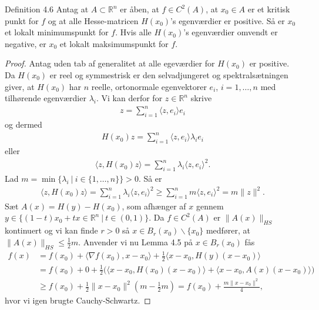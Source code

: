\begin{boks}{Definition 4.6}
  Antag at $A \subset \mathbb{R}^n$ er åben, at $f \in C^2(A)$, at $x_0 \in A$ er et kritisk punkt for $f$ og at alle Hesse-matricen $H(x_0)$'s egenværdier er positive.
  Så er $x_0$ et lokalt minimumspunkt for $f$. Hvis alle $H(x_0)$'s egenværdier omvendt er negative, er $x_0$ et lokalt maksimumspunkt for $f$.
\end{boks}
\begin{proof}
  Antag uden tab af generalitet at alle egeværdier for $H(x_0)$ er positive.
  Da $H(x_0)$ er reel og symmestrisk er den selvadjungeret og spektralsætningen giver, at $H(x_0)$ har $n$ reelle, ortonormale egenvektorer $e_i$, $i = 1, \ldots, n$ med tilhørende egenværdier $\lambda_i$. Vi kan derfor for $z \in \mathbb{R}^n$ skrive
  \begin{align*}
    z = \sum_{i = 1}^n \langle z, e_i \rangle e_i
  \end{align*}
  og dermed
  \begin{align*}
    H(x_0)z = \sum_{i = 1}^n \langle z, e_i \rangle \lambda_i e_i
  \end{align*}
  eller
  \begin{align*}
    \langle z, H(x_0)z \rangle = \sum_{i = 1}^n \lambda_i \langle z, e_i \rangle^2.
  \end{align*}
  Lad $m = \min \{ \lambda_i \ | \ i \in \{ 1, \ldots, n \}\} > 0$. Så er
  \begin{align*}
    \langle z, H(x_0)z \rangle = \sum_{i = 1}^n \lambda_i \langle z, e_i \rangle^2 \geq \sum_{i = 1}^n m \langle z, e_i \rangle^2 = m \| z \|^2.
  \end{align*}
  Sæt $A(x) = H(y) - H(x_0)$, som afhænger af $x$ gennem $y \in \{ (1 - t)x_0 + tx \in \mathbb{R}^n \ | \ t \in (0,1) \}$.
  Da $f \in C^2(A)$ er $\| A(x) \|_{HS}$ kontinuert og vi kan finde $r > 0$ så $x \in B_r(x_0) \backslash \{ x_0 \}$ medfører, at $\| A(x) \|_{HS} \leq \frac{1}{2}m$. Anvender vi nu Lemma 4.5 på $x \in B_r(x_0)$ fås
  \begin{align*}
    f(x) &= f(x_0) + \langle \nabla f(x_0), x - x_0 \rangle + \frac{1}{2}\langle x - x_0, H(y)(x - x_0)\rangle \\
    &= f(x_0) + 0 + \frac{1}{2}\Big( \langle x - x_0, H(x_0)(x - x_0) \rangle + \langle x - x_0, A(x)(x - x_0) \rangle \Big)\\
    &\geq f(x_0) + \frac{1}{2}\| x - x_0 \|^2 (m - \frac{1}{2}m) =
    f(x_0) + \frac{m\| x - x_0 \|^2}{4},
  \end{align*}
  hvor vi igen brugte Cauchy-Schwartz.
\end{proof}

